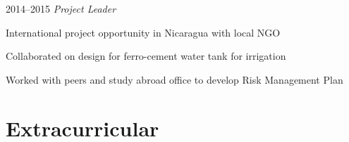 \documentclass[]{friggeri-cv} %
\begin{document}
\begin{entrylist}
{2014--2015}
{\emph{Project Leader}}
{\begin{itemizenosep}
	\item International project opportunity in Nicaragua with local NGO
	\item Collaborated on design for ferro-cement water tank for irrigation
	\item Worked with peers and study abroad office to develop Risk Management Plan 
\end{itemizenosep}}
\end{entrylist}

\section{Extracurricular}
\end{document}
